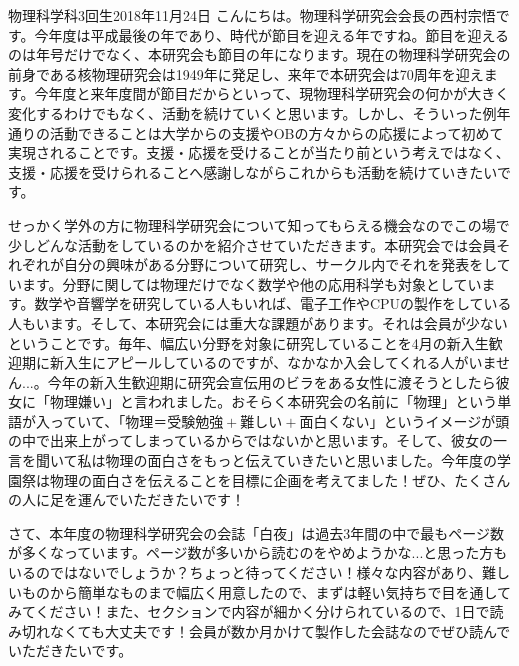 \documentclass[11pt,b5paper,papersize,dvipdfmx]{jsbook}
\begin{document}
\begin{kantogon}{物理科学科3回生}{\nsmr}{2018年11月24日}
  こんにちは。物理科学研究会会長の西村宗悟です。今年度は平成最後の年であり、時代が節目を迎える年ですね。節目を迎えるのは年号だけでなく、本研究会も節目の年になります。現在の物理科学研究会の前身である核物理研究会は1949年に発足し、来年で本研究会は70周年を迎えます。今年度と来年度間が節目だからといって、現物理科学研究会の何かが大きく変化するわけでもなく、活動を続けていくと思います。しかし、そういった例年通りの活動できることは大学からの支援やOBの方々からの応援によって初めて実現されることです。支援・応援を受けることが当たり前という考えではなく、支援・応援を受けられることへ感謝しながらこれからも活動を続けていきたいです。\par
  せっかく学外の方に物理科学研究会について知ってもらえる機会なのでこの場で少しどんな活動をしているのかを紹介させていただきます。本研究会では会員それぞれが自分の興味がある分野について研究し、サークル内でそれを発表をしています。分野に関しては物理だけでなく数学や他の応用科学も対象としています。数学や音響学を研究している人もいれば、電子工作やCPUの製作をしている人もいます。そして、本研究会には重大な課題があります。それは会員が少ないということです。毎年、幅広い分野を対象に研究していることを4月の新入生歓迎期に新入生にアピールしているのですが、なかなか入会してくれる人がいません...。今年の新入生歓迎期に研究会宣伝用のビラをある女性に渡そうとしたら彼女に「物理嫌い」と言われました。おそらく本研究会の名前に「物理」という単語が入っていて、「$物理＝受験勉強+難しい+面白くない$」というイメージが頭の中で出来上がってしまっているからではないかと思います。そして、彼女の一言を聞いて私は物理の面白さをもっと伝えていきたいと思いました。今年度の学園祭は物理の面白さを伝えることを目標に企画を考えてました！ぜひ、たくさんの人に足を運んでいただきたいです！\par
  さて、本年度の物理科学研究会の会誌「白夜」は過去3年間の中で最もページ数が多くなっています。ページ数が多いから読むのをやめようかな...と思った方もいるのではないでしょうか？ちょっと待ってください！様々な内容があり、難しいものから簡単なものまで幅広く用意したので、まずは軽い気持ちで目を通してみてください！また、セクションで内容が細かく分けられているので、1日で読み切れなくても大丈夫です！会員が数か月かけて製作した会誌なのでぜひ読んでいただきたいです。
  \vspace{-1zw}
\end{kantogon}
\end{document}
